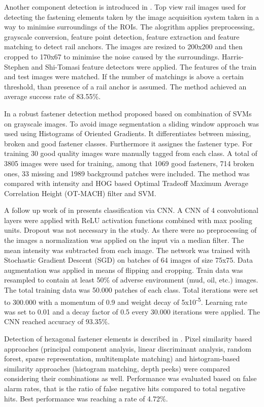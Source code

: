\documentclass[10pt, final]{article}
\begin{document}
Another component detection is introduced in \cite{khan_automatic_2014}.
Top view rail images used for detecting the fastening elements taken by the image acquisition system
taken in a way to minimise surroundings of the ROIs.
The alogrithm applies preprocessing, grayscale conversion, feature point detection, feature extraction
and feature matching to detect rail anchors.
The images are resized to 200x200 and then cropped to 170x67 to minimise the noise caused by the surroundings.
Harris-Stephen and Shi-Tomasi feature detectors were applied.
The features of the train and test images were matched.
If the number of matchings is above a certain threshold, than presence of a rail anchor is assumed.
The method achieved an average success rate of 83.55\%.

In \cite{gibert_robust_2015} a robust fastener detection method proposed based on combination of SVMs on grayscale
images.
To avoid image segmentation a sliding window approach was used using Histograms of Oriented Gradients.
It differentiates between missing, broken and good fastener classes.
Furthermore it assignes the fastener type.
For training 30 good quality images ware manually tagged from each class.
A total of 3805 images were used for training, among that 1069 good fasteners, 714 broken ones, 33 missing and
1989 background patches were included.
The method was compared with intensity and HOG based Optimal Tradeoff Maximum Average Correlation Height
(OT-MACH) filter and SVM.

A follow up work of \citeauthor{giben_material_2015} in \cite{giben_material_2015} presents classification via CNN.
A CNN of 4 convolutional layers were applied with ReLU activation functions combined with max pooling units.
Dropout was not necessary in the study.
As there were no preprocessing of the images a normalization was applied on the input via a median filter.
The mean intensity was subtracted from each image.
The network was trained with Stochastic Gradient Descent (SGD) on batches of 64 images of size 75x75.
Data augmentation was applied in means of flipping and cropping.
Train data was resampled to contain at least 50\% of adverse environment (mud, oil, etc.) images.
The total training data was 50.000 patches of each class.
Total iterations were set to 300.000 with a momentum of 0.9 and weight decay of 5x10\textsuperscript{-5}.
Learning rate was set to 0.01 and a decay factor of 0.5 every 30.000 iterations were applied.
The CNN reached accuracy of 93.35\%.

Detection of hexagonal fastener elements is described in \cite{aytekin_railway_2015}.
Pixel similarity based approaches (principal component analysis, linear discriminant analysis, random forest,
sparse representation, multitemplate matching) and histogram-based similarity approaches (histogram matching,
depth peeks) were compared considering their combinations as well.
Performance was evaluated based on false alarm rates, that is the ratio of false negative hits compared to
total negative hits.
Best performance was reaching a rate of 4.72\%.
\end{document}
